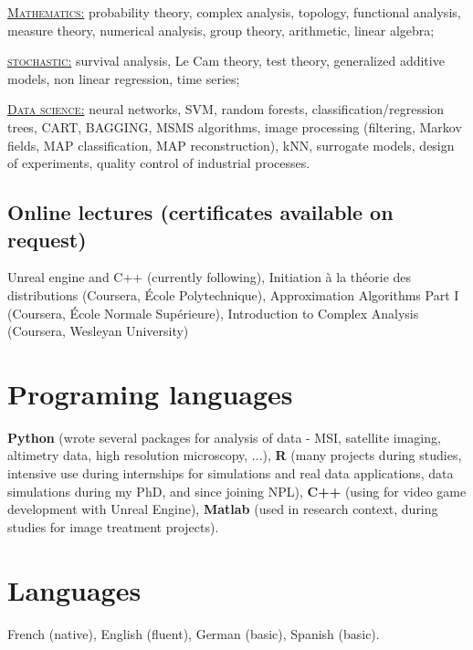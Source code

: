 \documentclass[11pt,a4paper,sans]{moderncv} %
\begin{document}
\begin{multicols}{2}
\underline{\textsc{Mathematics:}}
probability theory, complex analysis, topology, functional analysis, measure theory, numerical analysis, group theory, arithmetic, linear algebra;

\underline{\textsc{stochastic:}}
survival analysis, Le Cam theory, test theory, generalized additive models, non linear regression, time series;

\underline{\textsc{Data science:}} neural networks, SVM, random forests, classification/regression trees, CART, BAGGING, MSMS algorithms, image processing (filtering, Markov fields, MAP classification, MAP reconstruction), kNN, surrogate models, design of experiments, quality control of industrial processes.
\end{multicols}

\medskip

\subsection{Online lectures (certificates available on request)}
Unreal engine and C++ (currently following), Initiation \`a la th\'eorie des distributions (Coursera, \'Ecole Polytechnique), Approximation Algorithms Part I (Coursera, \'Ecole Normale Sup\'erieure), Introduction to Complex Analysis (Coursera, Wesleyan University)

\section{Programing languages}
\textbf{Python} (wrote several packages for analysis of data - MSI, satellite imaging, altimetry data, high resolution microscopy, ...), \textbf{R} (many projects during studies, intensive use during internships for simulations and real data applications, data simulations during my PhD, and since joining NPL), \textbf{C++} (using for video game development with Unreal Engine), \textbf{Matlab} (used in research context, during studies for image treatment projects).


\section{Languages}
French (native), English (fluent), German (basic), Spanish (basic).
\end{document}

